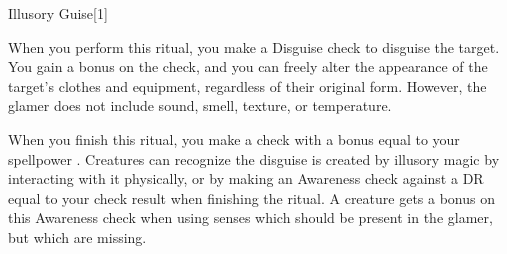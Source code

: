 \begin{spellsection}{Illusory Guise}[1]
    \begin{spellheader}
    \end{spellheader}
    \begin{spellcontent}
        \begin{spelltargetinginfo}
        \end{spelltargetinginfo}
        \begin{spelleffects}
            \spelleffect When you perform this ritual, you make a Disguise check to disguise the target.
            You gain a  bonus on the check, and you can freely alter the appearance of the target's clothes and equipment, regardless of their original form. However, the glamer does not include sound, smell, texture, or temperature.

            When you finish this ritual, you make a check with a bonus equal to your spellpower . Creatures can recognize the disguise is created by illusory magic by interacting with it physically, or by making an Awareness check against a DR equal to your check result when finishing the ritual. A creature gets a  bonus on this Awareness check when using senses which should be present in the glamer, but which are missing.
            \spelldur \durlong \dismissable
        \end{spelleffects}
    \end{spellcontent}
    \begin{spellfooter}
    \end{spellfooter}
    \begin{spellaugments}
    \end{spellaugments}
\end{spellsection}

